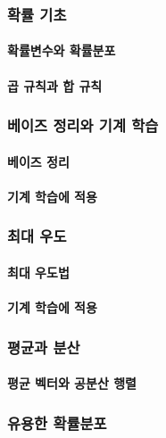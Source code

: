 \documentclass [12pt] {oblivoir}
\let\oldsubsubsection=\subsubsection
\renewcommand{\subsubsection}
{
  \filbreak
  \oldsubsubsection
}
\begin{document}
\subsubsection{확률 기초}

\paragraph*{확률변수와 확률분포}\mbox{}

\paragraph*{곱 규칙과 합 규칙}\mbox{}

\subsubsection{베이즈 정리와 기계 학습}

\paragraph*{베이즈 정리}\mbox{}

\paragraph*{기계 학습에 적용}\mbox{}

\subsubsection{최대 우도}

\paragraph*{최대 우도법}\mbox{}

\paragraph*{기계 학습에 적용}\mbox{}

\subsubsection{평균과 분산}

\paragraph*{평균 벡터와 공분산 행렬}\mbox{}

\subsubsection{유용한 확률분포}
\end{document}
